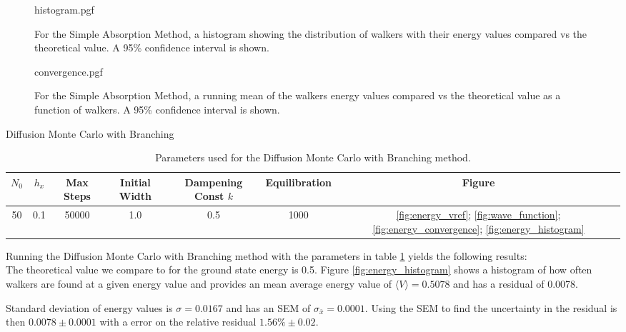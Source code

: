 \documentclass[reqno]{amsart}
\makeatletter
\renewcommand\subsection{\@startsection{subsection}{2}%
  \z@{.5\linespacing\@plus.7\linespacing}{-.5em}%
  {\normalfont\scshape\justify}}
\numberwithin{equation}{section}
\numberwithin{figure}{section}
\makeatother
\begin{document}
\begin{figure}[h]
    \centering
    {histogram.pgf}
    \caption{For the Simple Absorption Method, a histogram showing the distribution of walkers with their energy values compared vs the theoretical value. A 95\% confidence interval is shown.}
    \label{fig:SA_histogram}
\end{figure}

\begin{figure}[h]
    \centering
    {convergence.pgf}
    \caption{For the Simple Absorption Method, a running mean of the walkers energy values compared vs the theoretical value as a function of walkers. A 95\% confidence interval is shown.}
    \label{fig:SA_convergence}
\end{figure}

\subsection{Diffusion Monte Carlo with Branching}

\begin{table}[h]
    \centering
    \begin{tabular}{ccccccc}
        \hline
        $N_0$ & $h_x$ & Max Steps & Initial Width & Dampening Const $k$ & Equilibration & Figure \\
        \hline
        50 & 0.1 & 50000 & 1.0 & 0.5 & 1000 & \ref{fig:energy_vref}; \ref{fig:wave_function}; \ref{fig:energy_convergence}; \ref{fig:energy_histogram} \\
        \hline
    \end{tabular}
    \caption{Parameters used for the Diffusion Monte Carlo with Branching method.}
    \label{tab:DMCB_params}
\end{table}

Running the Diffusion Monte Carlo with Branching method with the parameters in table \ref{tab:DMCB_params} yields the following results: \\

The theoretical value we compare to for the ground state energy is 0.5. Figure \ref{fig:energy_histogram} shows a histogram of how often walkers are found at a given energy value and provides an mean average energy value of $\langle V \rangle = 0.5078$ and has a residual of 0.0078.

Standard deviation of energy values is $\sigma = 0.0167$ and has an SEM of $\sigma_{\bar{x}} = 0.0001$. Using the SEM to find the uncertainty in the residual is then $0.0078 \pm 0.0001$ with a error on the relative residual $1.56\% \pm 0.02$. \\
\end{document}
